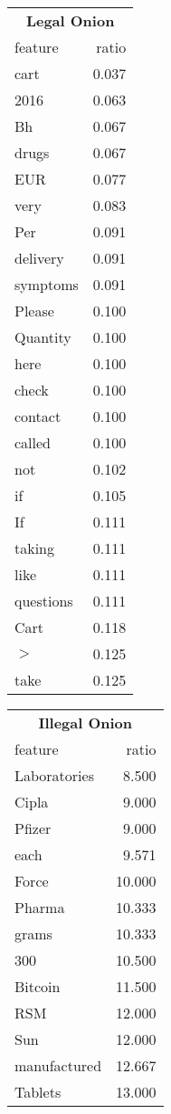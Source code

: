 \documentclass[11pt,a4paper,table]{article}
\begin{document}
\begin{table}[t]
\small
\begin{tabular}{lr}
\multicolumn{2}{c}{\textbf{Legal Onion}}\\
feature & ratio\\
\hline
cart & 0.037\\
2016 & 0.063\\
Bh & 0.067\\
drugs & 0.067\\
EUR & 0.077\\
very & 0.083\\
Per & 0.091\\
delivery & 0.091\\
symptoms & 0.091\\
Please & 0.100\\
Quantity & 0.100\\
here & 0.100\\
check & 0.100\\
contact & 0.100\\
called & 0.100\\
not & 0.102\\
if & 0.105\\
If & 0.111\\
taking & 0.111\\
like & 0.111\\
questions & 0.111\\
Cart & 0.118\\
$>$ & 0.125\\
take & 0.125\\
\end{tabular}
\begin{tabular}{lr}
\multicolumn{2}{c}{\textbf{Illegal Onion}}\\
feature & ratio\\
\hline
Laboratories & 8.500\\
Cipla & 9.000\\
Pfizer & 9.000\\
each & 9.571\\
Force & 10.000\\
Pharma & 10.333\\
grams & 10.333\\
300 & 10.500\\
Bitcoin & 11.500\\
RSM & 12.000\\
Sun & 12.000\\
manufactured & 12.667\\
Tablets & 13.000\\

\end{tabular}
\end{table}
\end{document}
